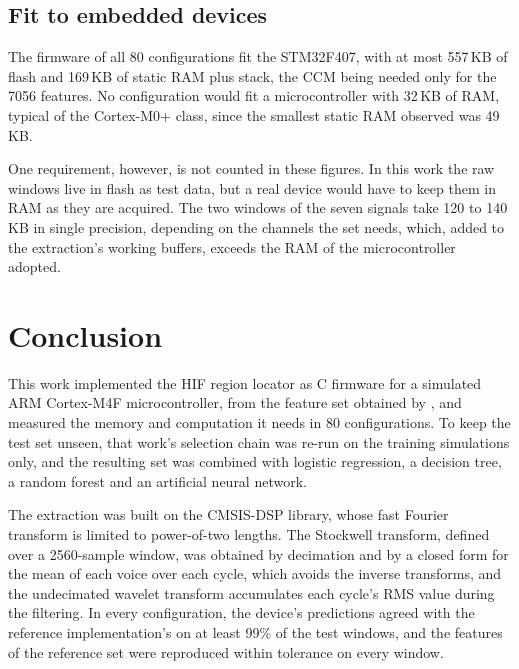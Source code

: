 \documentclass[11pt,a4paper]{article}
\begin{document}
\subsection{Fit to embedded devices}
The firmware of all 80 configurations fit the STM32F407, with at most 557\,KB of flash and 169\,KB of static RAM plus stack, the CCM being needed only for the 7056 features. No configuration would fit a microcontroller with 32\,KB of RAM, typical of the Cortex-M0+ class, since the smallest static RAM observed was 49\,KB.

One requirement, however, is not counted in these figures. In this work the raw windows live in flash as test data, but a real device would have to keep them in RAM as they are acquired. The two windows of the seven signals take 120 to 140\,KB in single precision, depending on the channels the set needs, which, added to the extraction's working buffers, exceeds the RAM of the microcontroller adopted.

\section{Conclusion}

This work implemented the HIF region locator as C firmware for a simulated ARM Cortex-M4F microcontroller, from the feature set obtained by \citet{martins_tcc_en}, and measured the memory and computation it needs in 80 configurations. To keep the test set unseen, that work's selection chain was re-run on the training simulations only, and the resulting set was combined with logistic regression, a decision tree, a random forest and an artificial neural network.

The extraction was built on the CMSIS-DSP library, whose fast Fourier transform is limited to power-of-two lengths. The Stockwell transform, defined over a 2560-sample window, was obtained by decimation and by a closed form for the mean of each voice over each cycle, which avoids the inverse transforms, and the undecimated wavelet transform accumulates each cycle's RMS value during the filtering. In every configuration, the device's predictions agreed with the reference implementation's on at least 99\% of the test windows, and the features of the reference set were reproduced within tolerance on every window.
\end{document}
